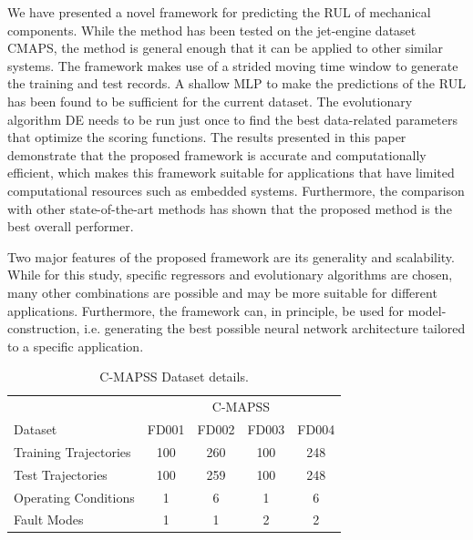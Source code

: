 \documentclass[preprint,12pt]{elsarticle}%
\begin{document}
\label{sec:conclusions}

We have presented a novel framework for predicting the RUL of mechanical
components. While the method has been tested on the jet-engine dataset
CMAPS, the method is general enough that it can be applied to other similar
systems. The framework makes use of a strided moving time window to generate
the training and test records. A shallow MLP to make the predictions of the RUL
has been found to be sufficient for the current dataset. The evolutionary
algorithm DE needs to be run just once to find the best data-related
parameters that optimize the scoring functions. The results presented in this
paper demonstrate that the proposed framework is accurate and computationally
efficient, which makes this framework suitable for applications that have
limited computational resources such as embedded systems. Furthermore, the
comparison with other state-of-the-art methods has shown that the proposed
method is the best overall performer.

Two major features of the proposed framework are its generality and
scalability. While for this study, specific regressors and evolutionary
algorithms are chosen, many other combinations are possible and may be more
suitable for different applications. Furthermore, the framework can, in
principle, be used for model-construction, i.e. generating the best possible
neural network architecture tailored to a specific application.



%

%


\clearpage


\onecolumn%

\begin{table}
\begin{center}
\caption{C-MAPSS Dataset details.}%
%

\begin{tabular}
[c]{l|cccc}\hline
& \multicolumn{4}{c}{C-MAPSS}\\
Dataset & FD001 & FD002 & FD003 & FD004\\\hline\hline
Training Trajectories & 100 & 260 & 100 & 248\\
Test Trajectories & 100 & 259 & 100 & 248\\
Operating Conditions & 1 & 6 & 1 & 6\\
Fault Modes & 1 & 1 & 2 & 2\\\hline
\end{tabular}
\label{TabCMAPSS}%

\end{center}
\end{table}
%
\end{document}
